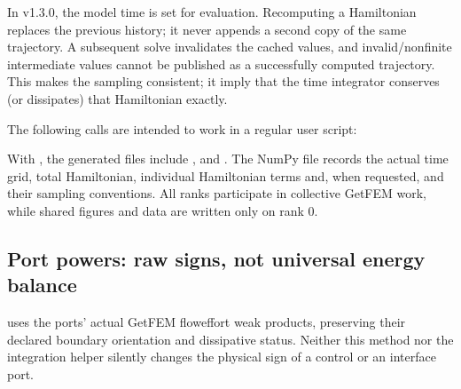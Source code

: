 \documentclass[letterpaper,10pt,english]{sphinxmanual}
\begin{document}
\sphinxAtStartPar
In v1.3.0, the model time is set for  evaluation. Recomputing a
Hamiltonian replaces the previous history; it never appends a second copy
of the same trajectory. A subsequent solve invalidates the cached values,
and invalid/nonfinite intermediate values cannot be published as a
successfully computed trajectory. This makes the sampling consistent; it
 imply that the time integrator conserves (or dissipates)
that Hamiltonian exactly.

\sphinxAtStartPar
The following calls are intended to work in a regular user script:

\begin{sphinxVerbatim}[commandchars=\\\{\}]
  
\end{sphinxVerbatim}

\sphinxAtStartPar
With , the generated files include
,
 and
. The NumPy file records the
actual time grid, total Hamiltonian, individual Hamiltonian terms and, when
requested,  and their sampling
conventions. All ranks participate in collective GetFEM work, while
shared figures and data are written only on rank 0.


\subsection{Port powers: raw signs, not universal energy balance}
\label{\detokenize{energy_and_power:port-powers-raw-signs-not-universal-energy-balance}}
\sphinxAtStartPar
{\hyperref[\detokenize{scrimp:scrimp.dphs.DPHS.compute_powers}]{}} uses the ports’ actual GetFEM
flow\sphinxhyphen{}effort weak products, preserving their declared boundary orientation
and dissipative status. Neither this method nor the integration helper
silently changes the physical sign of a control or an interface port.
\end{document}
